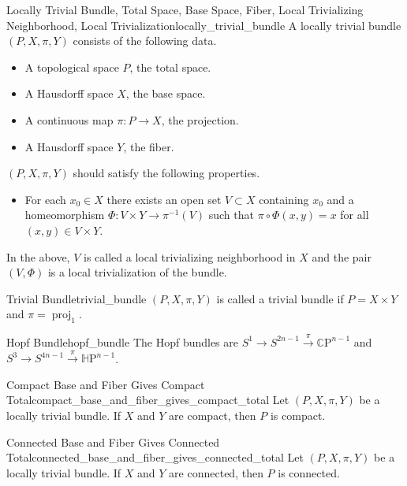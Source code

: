 \documentclass{article}
\begin{document}
\begin{definition}{Locally Trivial Bundle, Total Space, Base Space, Fiber, Local Trivializing Neighborhood, Local Trivialization}{locally_trivial_bundle}
    A locally trivial bundle $(P, X, \pi, Y)$ consists of the following data.
    \begin{itemize}
        \item A topological space $P$, the total space.
        \item A Hausdorff space $X$, the base space.
        \item A continuous map $\pi: P\rightarrow X$, the projection.
        \item A Hausdorff space $Y$, the fiber.
    \end{itemize}
    $(P, X, \pi, Y)$ should satisfy the following properties.
    \begin{itemize}
        \item For each $x_0\in X$ there exists an open set $V\subset X$ containing $x_0$ and a homeomorphism $\Phi: V \times Y \rightarrow \pi^{-1}(V)$ such that $\pi\circ \Phi(x, y) = x$ for all $(x, y) \in V \times Y$.
    \end{itemize}
    In the above, $V$ is called a local trivializing neighborhood in $X$ and the pair $(V, \Phi)$ is a local trivialization of the bundle.
\end{definition}

\begin{definition}{Trivial Bundle}{trivial_bundle}
    $(P,X,\pi,Y)$ is called a trivial bundle if $P = X\times Y$ and $\pi = \operatorname{proj}_1$.
\end{definition}

\begin{example}{Hopf Bundle}{hopf_bundle}
    The Hopf bundles are $S^1 \rightarrow S^{2n-1} \xrightarrow{\pi} \mathbb{C}\mathrm{P}^{n-1}$ and $S^3 \rightarrow S^{4n-1} \xrightarrow{\pi} \mathbb{H}\mathrm{P}^{n-1}$.
\end{example}

\begin{theorem}{Compact Base and Fiber Gives Compact Total}{compact_base_and_fiber_gives_compact_total}
    Let $(P,X,\pi,Y)$ be a locally trivial bundle.
    If $X$ and $Y$ are compact, then $P$ is compact.
\end{theorem}

\begin{theorem}{Connected Base and Fiber Gives Connected Total}{connected_base_and_fiber_gives_connected_total}
    Let $(P,X,\pi,Y)$ be a locally trivial bundle.
    If $X$ and $Y$ are connected, then $P$ is connected.
\end{theorem}
\end{document}
